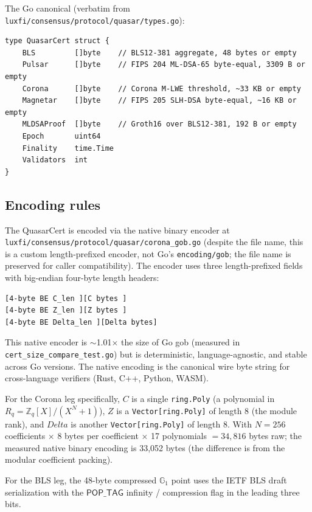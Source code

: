 The Go canonical (verbatim from
\texttt{luxfi/consensus/protocol/quasar/types.go}):

\begin{verbatim}
type QuasarCert struct {
    BLS         []byte    // BLS12-381 aggregate, 48 bytes or empty
    Pulsar      []byte    // FIPS 204 ML-DSA-65 byte-equal, 3309 B or empty
    Corona      []byte    // Corona M-LWE threshold, ~33 KB or empty
    Magnetar    []byte    // FIPS 205 SLH-DSA byte-equal, ~16 KB or empty
    MLDSAProof  []byte    // Groth16 over BLS12-381, 192 B or empty
    Epoch       uint64
    Finality    time.Time
    Validators  int
}
\end{verbatim}

\subsection{Encoding rules}
\label{sec:wire-corona}

The QuasarCert is encoded via the native binary encoder at
\texttt{luxfi/consensus/protocol/quasar/corona\_gob.go} (despite the
file name, this is a custom length-prefixed encoder, not Go's
\texttt{encoding/gob}; the file name is preserved for caller
compatibility). The encoder uses three length-prefixed fields with
big-endian four-byte length headers:

\begin{verbatim}
[4-byte BE C_len ][C bytes ]
[4-byte BE Z_len ][Z bytes ]
[4-byte BE Delta_len ][Delta bytes]
\end{verbatim}

This native encoder is $\sim$1.01$\times$ the size of Go gob (measured
in \texttt{cert\_size\_compare\_test.go}) but is deterministic,
language-agnostic, and stable across Go versions. The native encoding
is the canonical wire byte string for cross-language verifiers
(Rust, C++, Python, WASM).

For the Corona leg specifically, $C$ is a single \texttt{ring.Poly}
(a polynomial in $R_q = \mathbb{Z}_q[X]/(X^N+1)$), $Z$ is a
\texttt{Vector[ring.Poly]} of length 8 (the module rank), and
$\mathit{Delta}$ is another \texttt{Vector[ring.Poly]} of length 8.
With $N = 256$ coefficients $\times$ 8 bytes per coefficient
$\times$ 17 polynomials $= 34{,}816$ bytes raw; the measured native
binary encoding is 33{,}052 bytes (the difference is from the modular
coefficient packing).

For the BLS leg, the 48-byte compressed $\mathbb{G}_1$ point uses
the IETF BLS draft \cite{ietfbls} serialization with the
$\mathsf{POP\_TAG}$ infinity / compression flag in the leading
three bits.

